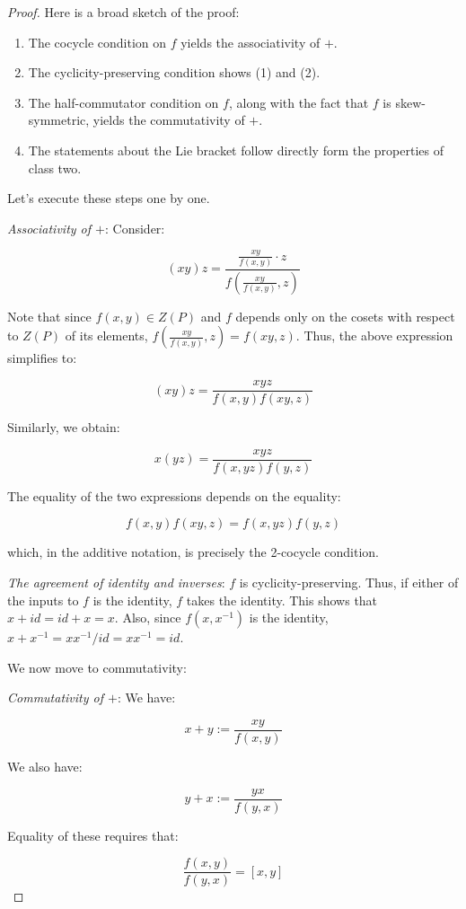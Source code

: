 \documentclass[10pt]{amsart}
\begin{document}
\begin{proof}
  Here is a broad sketch of the proof:
  \begin{enumerate}
  \item The cocycle condition on $f$ yields the associativity of $+$.
  \item The cyclicity-preserving condition shows (1) and (2).
  \item The half-commutator condition on $f$, along with the fact that
    $f$ is skew-symmetric, yields the commutativity of $+$.
  \item The statements about the Lie bracket follow directly form the
    properties of class two.
  \end{enumerate}

  Let's execute these steps one by one.

  {\em Associativity of $+$}: Consider:

  $$(xy)z = \frac{\frac{xy}{f(x,y)} \cdot z}{f\left(\frac{xy}{f(x,y)},z\right)}$$

  Note that since $f(x,y) \in Z(P)$ and $f$ depends only on the cosets
  with respect to $Z(P)$ of its elements, $f(\frac{xy}{f(x,y)},z) =
  f(xy,z)$. Thus, the above expression simplifies to:

  $$(xy)z = \frac{xyz}{f(x,y)f(xy,z)}$$

  Similarly, we obtain:

  $$x(yz) = \frac{xyz}{f(x,yz)f(y,z)}$$

  The equality of the two expressions depends on the equality:

  $$f(x,y)f(xy,z) = f(x,yz)f(y,z)$$

  which, in the additive notation, is precisely the 2-cocycle
  condition.

  {\em The agreement of identity and inverses}: $f$ is
  cyclicity-preserving. Thus, if either of the inputs to $f$ is the
  identity, $f$ takes the identity. This shows that $x + id = id + x =
  x$. Also, since $f(x,x^{-1})$ is the identity, $x + x^{-1} =
  xx^{-1}/id = xx^{-1} = id$.

  We now move to commutativity:

  {\em Commutativity of $+$}: We have:

  $$x + y := \frac{xy}{f(x,y)}$$

  We also have:

  $$y + x := \frac{yx}{f(y,x)}$$

  Equality of these requires that:

  $$\frac{f(x,y)}{f(y,x)} = [x,y]$$


\end{proof}
\end{document}
